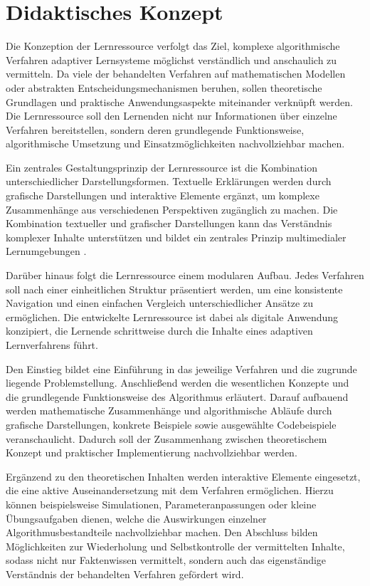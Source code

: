 \section{Didaktisches Konzept}\label{didaktisches-konzept}

Die Konzeption der Lernressource verfolgt das Ziel, komplexe
algorithmische Verfahren adaptiver Lernsysteme möglichst verständlich
und anschaulich zu vermitteln. Da viele der behandelten Verfahren auf
mathematischen Modellen oder abstrakten Entscheidungsmechanismen
beruhen, sollen theoretische Grundlagen und praktische Anwendungsaspekte
miteinander verknüpft werden. Die Lernressource soll den Lernenden nicht
nur Informationen über einzelne Verfahren bereitstellen, sondern deren
grundlegende Funktionsweise, algorithmische Umsetzung und
Einsatzmöglichkeiten nachvollziehbar machen.

Ein zentrales Gestaltungsprinzip der Lernressource ist die Kombination
unterschiedlicher Darstellungsformen. Textuelle Erklärungen werden durch
grafische Darstellungen und interaktive Elemente ergänzt, um komplexe
Zusammenhänge aus verschiedenen Perspektiven zugänglich zu machen. Die
Kombination textueller und grafischer Darstellungen kann das Verständnis
komplexer Inhalte unterstützen und bildet ein zentrales Prinzip
multimedialer Lernumgebungen \citep{Mayer2005}.

Darüber hinaus folgt die Lernressource einem modularen Aufbau. Jedes
Verfahren soll nach einer einheitlichen Struktur präsentiert werden, um
eine konsistente Navigation und einen einfachen Vergleich
unterschiedlicher Ansätze zu ermöglichen. Die entwickelte Lernressource
ist dabei als digitale Anwendung konzipiert, die Lernende schrittweise
durch die Inhalte eines adaptiven Lernverfahrens führt.

Den Einstieg bildet eine Einführung in das jeweilige Verfahren und die
zugrunde liegende Problemstellung. Anschließend werden die wesentlichen
Konzepte und die grundlegende Funktionsweise des Algorithmus erläutert.
Darauf aufbauend werden mathematische Zusammenhänge und algorithmische
Abläufe durch grafische Darstellungen, konkrete Beispiele sowie
ausgewählte Codebeispiele veranschaulicht. Dadurch soll der Zusammenhang
zwischen theoretischem Konzept und praktischer Implementierung
nachvollziehbar werden.

Ergänzend zu den theoretischen Inhalten werden interaktive Elemente
eingesetzt, die eine aktive Auseinandersetzung mit dem Verfahren
ermöglichen. Hierzu können beispielsweise Simulationen,
Parameteranpassungen oder kleine Übungsaufgaben dienen, welche die
Auswirkungen einzelner Algorithmusbestandteile nachvollziehbar machen.
Den Abschluss bilden Möglichkeiten zur Wiederholung und Selbstkontrolle
der vermittelten Inhalte, sodass nicht nur Faktenwissen vermittelt,
sondern auch das eigenständige Verständnis der behandelten Verfahren
gefördert wird.

